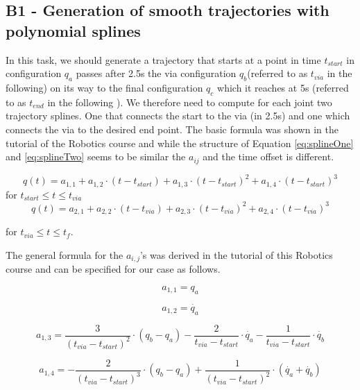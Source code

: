 \subsection{B1 - Generation of smooth trajectories with polynomial splines}
In this task, we should generate a trajectory that starts at a point in time $t_{start}$ in configuration $q_a$ passes after 2.5s the via configuration $q_b$(referred to as $t_{via}$ in the following) on its way to the final configuration $q_c$ which it reaches at 5s (referred to as $t_{end}$ in the following ). We therefore need to compute for each joint two trajectory splines. One that connects the start to the via (in 2.5s) and one which connects the via to the desired end point. The basic formula was shown in the tutorial of the Robotics course and while the structure of Equation \ref{eq:splineOne} and \ref{eq:splineTwo} seems to be similar the $a_{ij}$ and the time offset is different. 


\begin{equation}
    q(t) = a_{1,1} + a_{1,2} \cdot (t- t_{start}) + a_{1,3} \cdot (t-t_{start})^2 + a_{1,4}\cdot (t-t_{start})^3
    \label{eq:splineOne}
\end{equation}
for $ t_{start} \leq t \leq t_{via}$
\begin{equation}
   q(t) = a_{2,1} + a_{2,2} \cdot (t- t_{via}) + a_{2,3} \cdot (t-t_{via})^2 + a_{2,4}\cdot (t-t_{via})^3
   \label{eq:splineTwo}
\end{equation}

for $ t_{via} \leq t \leq t_f$.

The general formula for the $a_{i,j}$'s was derived in the tutorial of this Robotics course and can be specified for our case as follows. 


\begin{equation}
a_{1,1}=q_a
\end{equation}

\begin{equation}
a_{1,2}=\dot{q_a}
\end{equation}

\begin{equation}
a_{1,3}=\frac{3}{(t_{via}-t_{start})^2}\cdot(q_b-q_a)- \frac{2}{t_{via}-t_{start}}\cdot \dot{q_a}- \frac{1}{t_{via}-t_{start}} \cdot \dot{q_b}
\end{equation}

\begin{equation}
a_{1,4}=-\frac{2}{(t_{via}-t_{start})^3}\cdot(q_b-q_a)+ \frac{1}{(t_{via}-t_{start})^2}\cdot(\dot{q_a}+\dot{q_b})
\end{equation}

